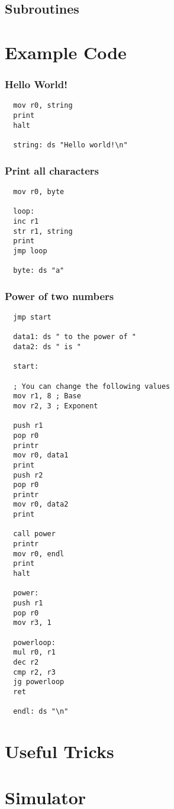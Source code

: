 \documentclass[oneside]{book}
\begin{document}
    \section{Subroutines}
  \clearpage
  
  \chapter{Example Code}
  
  \subsection{Hello World!}
  \begin{Verbatim}
  mov r0, string
  print
  halt
  
  string: ds "Hello world!\n"
  \end{Verbatim}
  
  \subsection{Print all characters}
  \begin{Verbatim}
  mov r0, byte
  
  loop:
  inc r1
  str r1, string
  print
  jmp loop
  
  byte: ds "a"
  \end{Verbatim}
  
  \subsection{Power of two numbers}
  \begin{Verbatim}
  jmp start
  
  data1: ds " to the power of "
  data2: ds " is "
  
  start:
  
  ; You can change the following values
  mov r1, 8 ; Base
  mov r2, 3 ; Exponent
  
  push r1
  pop r0
  printr
  mov r0, data1
  print
  push r2
  pop r0
  printr
  mov r0, data2
  print
  
  call power
  printr
  mov r0, endl
  print
  halt
  
  power:
  push r1
  pop r0
  mov r3, 1
  
  powerloop:
  mul r0, r1
  dec r2
  cmp r2, r3
  jg powerloop
  ret
  
  endl: ds "\n"
  \end{Verbatim}
  
  \clearpage
  
  \chapter{Useful Tricks}
  \clearpage
  
  \chapter{Simulator}
  \clearpage
  
  
\end{document}
